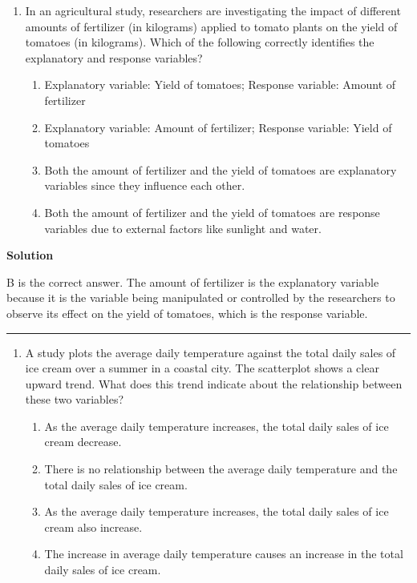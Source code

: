 \documentclass[
  letterpaper,
  DIV=11,
  numbers=noendperiod,
  oneside]{scrreprt}
\providecommand{\tightlist}{%
  \setlength{\itemsep}{0pt}\setlength{\parskip}{0pt}}\usepackage{longtable,booktabs,array}
\begin{document}
\begin{enumerate}
\def\labelenumi{\arabic{enumi}.}
\setcounter{enumi}{1}
\tightlist
\item
  In an agricultural study, researchers are investigating the impact of
  different amounts of fertilizer (in kilograms) applied to tomato
  plants on the yield of tomatoes (in kilograms). Which of the following
  correctly identifies the explanatory and response variables?

  \begin{enumerate}
  \def\labelenumii{\alph{enumii}.}
  \tightlist
  \item
    Explanatory variable: Yield of tomatoes; Response variable: Amount
    of fertilizer
  \item
    Explanatory variable: Amount of fertilizer; Response variable: Yield
    of tomatoes
  \item
    Both the amount of fertilizer and the yield of tomatoes are
    explanatory variables since they influence each other.
  \item
    Both the amount of fertilizer and the yield of tomatoes are response
    variables due to external factors like sunlight and water.
  \end{enumerate}
\end{enumerate}

\textbf{Solution}

B is the correct answer. The amount of fertilizer is the explanatory
variable because it is the variable being manipulated or controlled by
the researchers to observe its effect on the yield of tomatoes, which is
the response variable.

\begin{center}\rule{0.5\linewidth}{0.5pt}\end{center}

\begin{enumerate}
\def\labelenumi{\arabic{enumi}.}
\setcounter{enumi}{2}
\tightlist
\item
  A study plots the average daily temperature against the total daily
  sales of ice cream over a summer in a coastal city. The scatterplot
  shows a clear upward trend. What does this trend indicate about the
  relationship between these two variables?

  \begin{enumerate}
  \def\labelenumii{\alph{enumii}.}
  \tightlist
  \item
    As the average daily temperature increases, the total daily sales of
    ice cream decrease.
  \item
    There is no relationship between the average daily temperature and
    the total daily sales of ice cream.
  \item
    As the average daily temperature increases, the total daily sales of
    ice cream also increase.
  \item
    The increase in average daily temperature causes an increase in the
    total daily sales of ice cream.
  \end{enumerate}
\end{enumerate}
\end{document}
